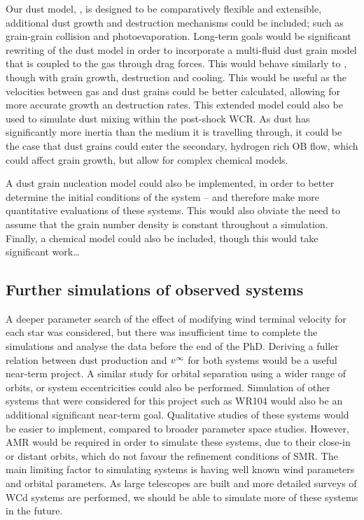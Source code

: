 Our dust model, \bidmas{}, is designed to be comparatively flexible and extensible, additional dust growth and destruction mechanisms could be included; such as grain-grain collision and photoevaporation.
Long-term goals would be significant rewriting of the dust model in order to incorporate a multi-fluid dust grain model that is coupled to the gas through drag forces.
This would behave similarly to \textcite{hendrix_pinwheels_2016}, though with grain growth, destruction and cooling.
This would be useful as the velocities between gas and dust grains could be better calculated, allowing for more accurate growth an destruction rates.
This extended model could also be used to simulate dust mixing within the post-shock WCR.
As dust has significantly more inertia than the medium it is travelling through, it could be the case that dust grains could enter the secondary, hydrogen rich OB flow, which could affect grain growth, but allow for complex chemical models. 

A dust grain nucleation model could also be implemented, in order to better determine the initial conditions of the system -- and therefore make more quantitative evaluations of these systems.
This would also obviate the need to assume that the grain number density is constant throughout a simulation.
Finally, a chemical model could also be included, though this would take significant work\ldots

\subsection{Further simulations of observed systems}

A deeper parameter search of the effect of modifying wind terminal velocity for each star was considered, but there was insufficient time to complete the simulations and analyse the data before the end of the PhD.
Deriving a fuller relation between dust production and $v^\infty$ for both systems would be a useful near-term project.
A similar study for orbital separation using a wider range of orbits, or system eccentricities could also be performed.
Simulation of other systems that were considered for this project such as WR104 would also be an additional significant near-term goal.
Qualitative studies of these systems would be easier to implement, compared to broader parameter space studies.
However, AMR would be required in order to simulate these systems, due to their close-in or distant orbits, which do not favour the refinement conditions of SMR.
The main limiting factor to simulating systems is having well known wind parameters and orbital parameters.
As large telescopes are built and more detailed surveys of WCd systems are performed, we should be able to simulate more of these systems in the future.

